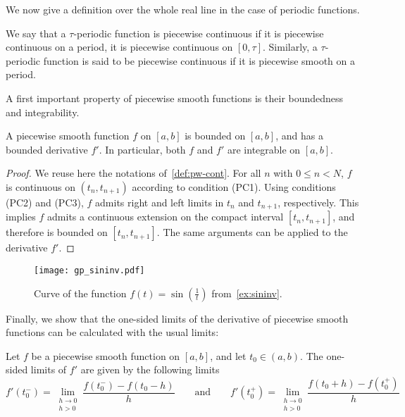 We now give a definition over the whole real line in the case of periodic functions.
\begin{definition}
  We say that a $\tau$-periodic function is piecewise continuous if it is piecewise
  continuous on a period, \eg it is piecewise continuous on $[0,\tau]$. Similarly, a
  $\tau$-periodic function is said to be piecewise continuous if it is piecewise smooth on
  a period.
\end{definition}
A first important property of piecewise smooth functions is their boundedness and
integrability.
\begin{proposition}
  A piecewise smooth function $f$ on $[a,b]$ is bounded on $[a,b]$, and has a bounded
  derivative $f'$. In particular, both $f$ and $f'$ are integrable on $[a,b]$.
\end{proposition}
\begin{proof}
  We reuse here the notations of~\cref{def:pw-cont}. For all $n$ with $0\leq n< N$, $f$ is
  continuous on $(t_n,t_{n+1})$ according to condition (PC1). Using conditions (PC2) and
  (PC3), $f$ admits right and left limits in $t_n$ and $t_{n+1}$, respectively. This
  implies $f$ admits a continuous extension on the compact interval $[t_n,t_{n+1}]$, and
  therefore is bounded on $[t_n,t_{n+1}]$. The same arguments can be applied to the
  derivative $f'$.
\end{proof}
\begin{figure}[t]
  \centering
  \texttt{[image: gp\_sininv.pdf]}
  \caption{Curve of the function $f(t)=\sin(\frac{1}{t})$ from~\cref{ex:sininv}.}
  \label{fig:sininv}
\end{figure}
Finally, we show that the one-sided limits of the derivative of piecewise smooth functions
can be calculated with the usual limits:
\begin{proposition}
  \label{prop:oneside-der}
  Let $f$ be a piecewise smooth function on $[a,b]$, and let $t_0\in(a,b)$. The one-sided
  limits of $f'$ are given by the following limits
  \begin{equation}
    f'(t_0^-)=\lim_{\substack{h\to0\\h>0}}\frac{f(t_0^-)-f(t_0-h)}{h}
    \qquad\text{and}\qquad
    f'(t_0^+)=\lim_{\substack{h\to0\\h>0}}\frac{f(t_0+h)-f(t_0^+)}{h}
  \end{equation}
\end{proposition}
